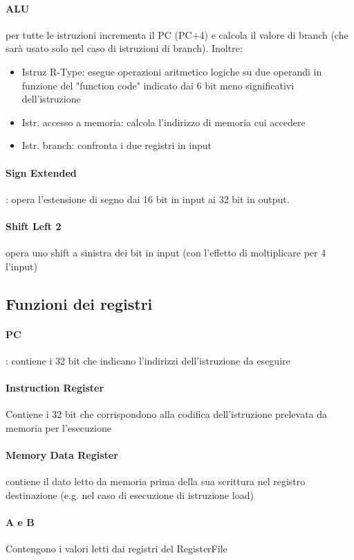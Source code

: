 \documentclass[12pt, a4paper, openany]{book}
\begin{document}
\paragraph*{ALU} per tutte le istruzioni incrementa il PC (PC+4) e calcola il valore
di branch (che sarà usato solo nel caso di istruzioni di branch).
Inoltre:
\begin{itemize}
    \item Istruz R-Type: esegue operazioni aritmetico logiche su due operandi in funzione
    del "function code" indicato dai 6 bit meno significativi dell'istruzione
    \item Istr. accesso a memoria: calcola l'indirizzo di memoria cui accedere
    \item Istr. branch: confronta i due registri in input
\end{itemize}
\paragraph*{Sign Extended}: opera l'estensione di segno dai 16 bit in input ai 32 bit in output.
\paragraph*{Shift Left 2} opera uno shift a sinistra dei bit in input (con l'effetto di 
moltiplicare per 4 l'input)

\subsection{Funzioni dei registri}
\paragraph*{PC}: contiene i 32 bit che indicano l'indirizzi dell'istruzione da eseguire
\paragraph*{Instruction Register} Contiene i 32 bit che corrispondono alla codifica
dell'istruzione prelevata da memoria per l'esecuzione
\paragraph*{Memory Data Register} contiene il dato letto da memoria prima della sua scrittura
nel registro destinazione (e.g. nel caso di esecuzione di istruzione load)
\paragraph*{A e B} Contengono i valori letti dai registri del RegisterFile
\end{document}
